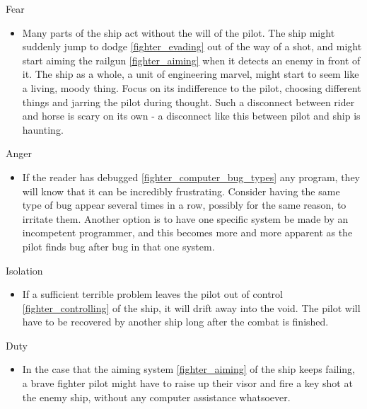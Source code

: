 \documentclass[a4paper]{article}
\begin{document}
\vspace{0.3cm}
\begin{minipage}[t]{0.4\linewidth}
Fear
\begin{itemize}
\item Many parts of the ship act without the will of the pilot. The ship might suddenly jump to dodge \ref{fighter_evading} out of the way of a shot, and might start aiming the railgun \ref{fighter_aiming} when it detects an enemy in front of it. The ship as a whole, a unit of engineering marvel, might start to seem like a living, moody thing. Focus on its indifference to the pilot, choosing different things and jarring the pilot during thought. Such a disconnect between rider and horse is scary on its own - a disconnect like this between pilot and ship is haunting.
\end{itemize}
\end{minipage} 
\begin{minipage}[t]{0.4\linewidth}
Anger
\begin{itemize}
\item If the reader has debugged \ref{fighter_computer_bug_types} any program, they will know that it can be incredibly frustrating. Consider having the same type of bug appear several times in a row, possibly for the same reason, to irritate them. Another option is to have one specific system be made by an incompetent programmer, and this becomes more and more apparent as the pilot finds bug after bug in that one system.
\end{itemize}
\end{minipage}

\begin{minipage}[t]{0.4\linewidth}
Isolation
\begin{itemize}
\item If a sufficient terrible problem leaves the pilot out of control \ref{fighter_controlling} of the ship, it will drift away into the void. The pilot will have to be recovered by another ship long after the combat is finished.
\end{itemize}
\end{minipage}
\begin{minipage}[t]{0.4\linewidth}
Duty
\begin{itemize}
\item In the case that the aiming system \ref{fighter_aiming} of the ship keeps failing, a brave fighter pilot might have to raise up their visor and fire a key shot at the enemy ship, without any computer assistance whatsoever. 
\end{itemize}
\end{minipage}
\end{document}
